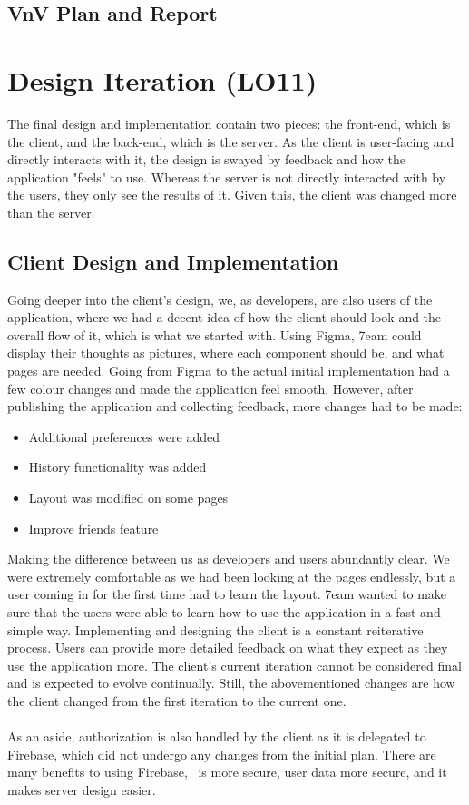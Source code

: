 \documentclass{article}
\begin{document}
\subsection{VnV Plan and Report}

\section{Design Iteration (LO11)}

\noindent The final design and implementation contain two pieces: the front-end, which is the client, and the back-end, which is the server. As the client is user-facing and directly interacts with it, the design is swayed by feedback and how the application "feels" to use. Whereas the server is not directly interacted with by the users, they only see the results of it. Given this, the client was changed more than the server.

\subsection{Client Design and Implementation}
Going deeper into the client's design, we, as developers, are also users of the application, where we had a decent idea of how the client should look and the overall flow of it, which is what we started with. Using Figma, 7eam could display their thoughts as pictures, where each component should be, and what pages are needed. Going from Figma to the actual initial implementation had a few colour changes and made the application feel smooth. However, after publishing the application and collecting feedback, more changes had to be made:
\begin{itemize}
	\item Additional preferences were added
	\item History functionality was added
	\item Layout was modified on some pages
	\item Improve friends feature
\end{itemize}
Making the difference between us as developers and users abundantly clear. We were extremely comfortable as we had been looking at the pages endlessly, but a user coming in for the first time had to learn the layout. 7eam wanted to make sure that the users were able to learn how to use the application in a fast and simple way. Implementing and designing the client is a constant reiterative process. Users can provide more detailed feedback on what they expect as they use the application more. The client's current iteration cannot be considered final and is expected to evolve continually. Still, the abovementioned changes are how the client changed from the first iteration to the current one.
\\~\\ As an aside, authorization is also handled by the client as it is delegated to Firebase, which did not undergo any changes from the initial plan. There are many benefits to using Firebase, \progname ~is more secure, user data more secure, and it makes server design easier.
\end{document}
